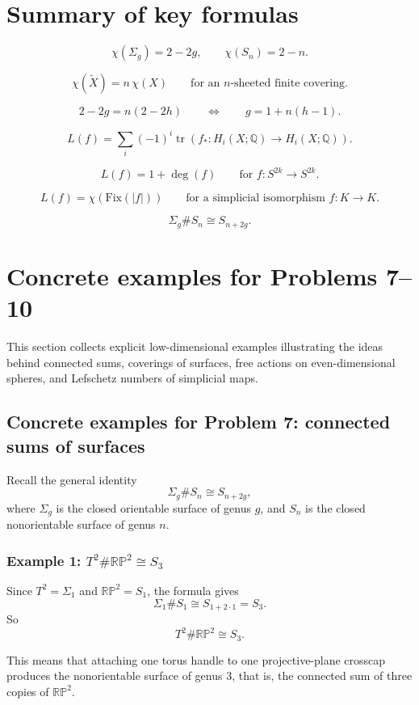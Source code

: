 \documentclass[12pt,a4paper]{article}
\newcommand{\Q}{\mathbb{Q}}
\newcommand{\RP}{\mathbb{RP}}
\newcommand{\Chi}{\chi}
\theoremstyle{notespace}
\begin{document}
	\section{Summary of key formulas}
	
	\[
	\Chi(\Sigma_g)=2-2g,\qquad \Chi(S_n)=2-n.
	\]
	
	\[
	\Chi(\widetilde X)=n\,\Chi(X)\qquad \text{for an $n$-sheeted finite covering.}
	\]
	
	\[
	2-2g=n(2-2h)\qquad \Longleftrightarrow \qquad g=1+n(h-1).
	\]
	
	\[
	L(f)=\sum_i (-1)^i\operatorname{tr}(f_*:H_i(X;\Q)\to H_i(X;\Q)).
	\]
	
	\[
	L(f)=1+\deg(f)\qquad \text{for }f:S^{2k}\to S^{2k}.
	\]
	
	\[
	L(f)=\Chi(\mathrm{Fix}(|f|))\qquad \text{for a simplicial isomorphism }f:K\to K.
	\]
	
	\[
	\Sigma_g\#S_n\cong S_{n+2g}.
	\]
	
\section{Concrete examples for Problems 7--10}

This section collects explicit low-dimensional examples illustrating the ideas behind connected sums, coverings of surfaces, free actions on even-dimensional spheres, and Lefschetz numbers of simplicial maps.

\subsection{Concrete examples for Problem 7: connected sums of surfaces}

Recall the general identity
\[
\Sigma_g \# S_n \cong S_{n+2g},
\]
where \(\Sigma_g\) is the closed orientable surface of genus \(g\), and \(S_n\) is the closed nonorientable surface of genus \(n\).

\subsubsection*{Example 1: \(T^2 \# \RP^2 \cong S_3\)}

Since \(T^2=\Sigma_1\) and \(\RP^2=S_1\), the formula gives
\[
\Sigma_1 \# S_1 \cong S_{1+2\cdot 1}=S_3.
\]
So
\[
T^2 \# \RP^2 \cong S_3.
\]

This means that attaching one torus handle to one projective-plane crosscap produces the nonorientable surface of genus \(3\), that is, the connected sum of three copies of \(\RP^2\).
\end{document}
